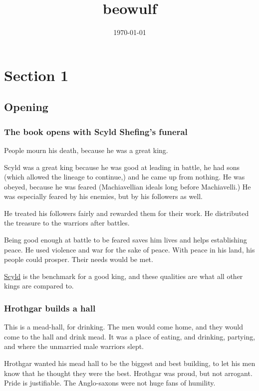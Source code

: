 \documentclass[11pt]{article}
\date{\today}
\title{beowulf}
\begin{document}
\maketitle
\tableofcontents

\section{Section 1}
\label{sec-1}
\subsection{Opening}
\label{sec-1-1}
\subsubsection{The book opens with Scyld Shefing's funeral}
\label{sec-1-1-1}
People mourn his death, because he was a great king.

Scyld was a great king because he was good at leading in battle, he had
sons (which allowed the lineage to continue,) and he came up from
nothing.  He was obeyed, because he was feared (Machiavellian ideals
long before Machiavelli.)  He was especially feared by his enemies, but
by his followers as well.

He treated his followers fairly and rewarded them for their work.  He
distributed the treasure to the warriors after battles.

Being good enough at battle to be feared saves him lives and helps
establishing peace.  He used violence and war for the sake of peace.
With peace in his land, his people could prosper.  Their needs would
be met.

\uline{Scyld} is the benchmark for a good king, and these qualities are what
all other kings are compared to.

\subsubsection{Hrothgar builds a hall}
\label{sec-1-1-2}
This is a mead-hall, for drinking.  The men would come home, and they 
would come to the hall and drink mead.  It was a place of eating, and
drinking, partying, and where the unmarried male warriors slept.

Hrothgar wanted his mead hall to be the biggest and best building, to
let his men know that he thought they were the best.  Hrothgar was 
proud, but not arrogant.  Pride is justifiable.  The Anglo-saxons were
not huge fans of humility.
\end{document}
